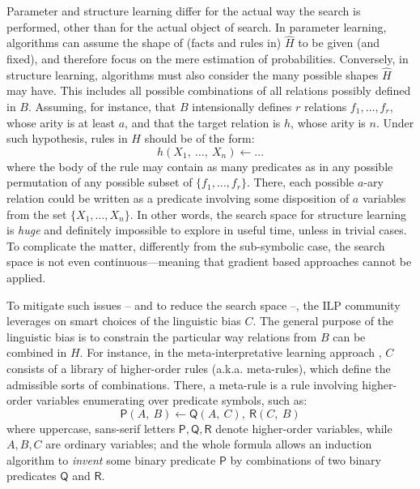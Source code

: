 \documentclass[12pt,a4paper,openright,twoside]{book}
\begin{document}
Parameter and structure learning differ for the actual way the search is performed, other than for the actual object of search.
%
In parameter learning, algorithms can assume the shape of (facts and rules in) $\hat{H}$ to be given (and fixed), and therefore focus on the mere estimation of probabilities.
%
Conversely, in structure learning, algorithms must also consider the many possible shapes $\hat{H}$ may have.
%
This includes all possible combinations of all relations possibly defined in $B$.
%
Assuming, for instance, that $B$ intensionally defines $r$ relations $f_1, \ldots, f_r$, whose arity is at least $a$, and that the target relation is $h$, whose arity is $n$.
%
Under such hypothesis, rules in $H$ should be of the form:
%
\begin{equation*}
    h(X_1,\ \ldots,\ X_n) \leftarrow \ldots
\end{equation*}
%
where the body of the rule may contain as many predicates as in any possible permutation of any possible subset of $\{ f_1, \ldots, f_r \}$.
%
There, each possible $a$-ary relation could be written as a predicate involving some disposition of $a$ variables from the set $\{ X_1, \ldots, X_n \}$.
%
In other words, the search space for structure learning is \emph{huge} and definitely impossible to explore in useful time, unless in trivial cases.
%
To complicate the matter, differently from the sub-symbolic case, the search space is not even continuous---meaning that gradient based approaches cannot be applied.

To mitigate such issues -- and to reduce the search space --, the ILP community leverages on smart choices of the linguistic bias $C$.
%
The general purpose of the linguistic bias is to constrain the particular way relations from $B$ can be combined in $H$.
%
For instance, in the meta-interpretative learning approach \cite{MuggletonLPT14}, $C$ consists of a library of higher-order rules (a.k.a. meta-rules), which define the admissible sorts of combinations.
%
There, a meta-rule is a rule involving higher-order variables enumerating over predicate symbols, such as:
%
\begin{equation}\label{eq:meta-rule-example}
    \textsf{P}(A,\ B) \leftarrow \textsf{Q}(A,\ C),\ \textsf{R}(C,\ B)
\end{equation}
%
where uppercase, sans-serif letters $\textsf{P}, \textsf{Q}, \textsf{R}$ denote higher-order variables, while $A, B, C$ are ordinary variables; and the whole formula allows an induction algorithm to \emph{invent} \cite{MuggletonB88} some binary predicate $\textsf{P}$ by combinations of two binary predicates $\textsf{Q}$ and $\textsf{R}$.
\end{document}
